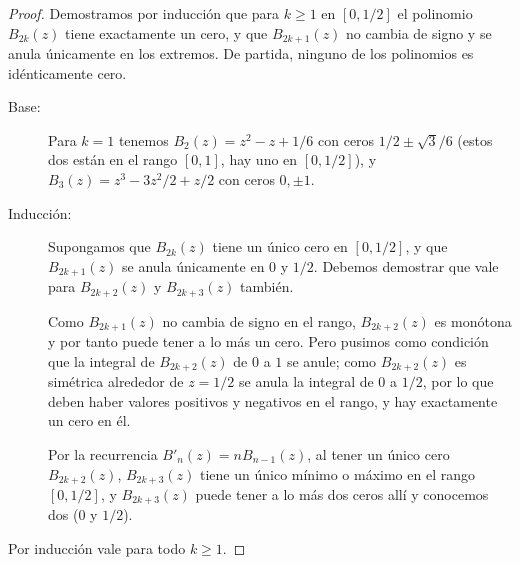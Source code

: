   \begin{proof}
    Demostramos por inducción que para \(k \ge 1\) en \([0, 1 / 2]\)
    el polinomio \(B_{2 k} (z)\) tiene exactamente un cero,%
    y que \(B_{2 k + 1}(z)\) no cambia de signo
    y se anula únicamente en los extremos.
    De partida,
    ninguno de los polinomios es idénticamente cero.
    \begin{description}
    \item[Base:]
      Para \(k = 1\) tenemos \(B_2(z) = z^2 - z + 1 / 6\)
      con ceros \(1 / 2 \pm \sqrt{3} / 6\)
      (estos dos están en el rango  \([0, 1]\),
       hay uno en \([0, 1/2]\)),
      y \(B_3(z) = z^3 - 3 z^2 / 2 + z / 2\) con ceros \(0, \pm 1\).
    \item[Inducción:]
      Supongamos que \(B_{2 k}(z)\)
      tiene un único cero en \([0, 1 / 2]\),
      y que \(B_{2 k + 1}(z)\)
      se anula únicamente en \(0\) y \(1 /2\).
      Debemos demostrar que vale para \(B_{2 k + 2}(z)\)
      y \(B_{2 k +3}(z)\) también.

      Como \(B_{2 k + 1}(z)\) no cambia de signo en el rango,
      \(B_{2 k + 2}(z)\) es monótona
      y por tanto puede tener a lo más un cero.
      Pero pusimos como condición
      que la integral de \(B_{2 k + 2}(z)\)
      de \(0\) a \(1\) se anule;
      como \(B_{2 k + 2}(z)\)
      es simétrica alrededor de \(z = 1 / 2\)
      se anula la integral de \(0\) a \(1 / 2\),
      por lo que deben haber valores positivos y negativos
      en el rango,
      y hay exactamente un cero en él.

      Por la recurrencia \(B'_n (z) = n B_{n - 1} (z)\),
      al tener un único cero \(B_{2 k + 2} (z)\),
      \(B_{2 k + 3}(z)\) tiene un único mínimo o máximo
      en el rango \([0, 1/2]\),
      y \(B_{2 k + 3}(z)\) puede tener a lo más dos ceros allí
      y conocemos dos (0 y \(1 / 2\)).
    \end{description}
    Por inducción vale para todo \(k \ge 1\).
  \end{proof}

